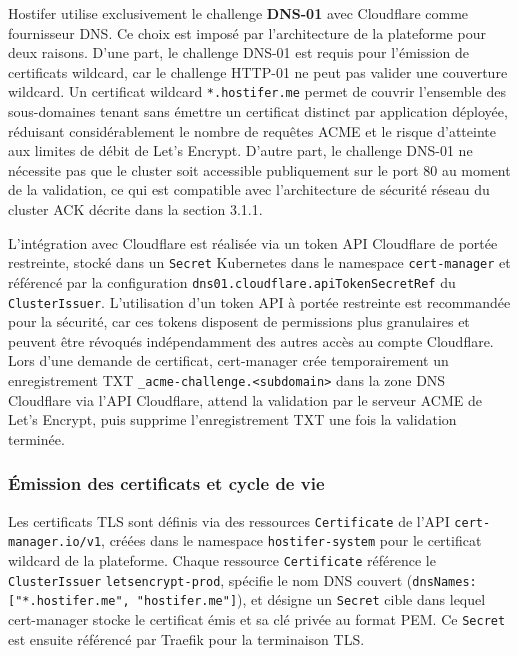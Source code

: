 Hostifer utilise exclusivement le challenge \textbf{DNS-01} avec Cloudflare comme fournisseur DNS. Ce choix est imposé par l'architecture de la plateforme pour deux raisons. D'une part, le challenge DNS-01 est requis pour l'émission de certificats wildcard, car le challenge HTTP-01 ne peut pas valider une couverture wildcard.  Un certificat wildcard \texttt{*.hostifer.me} permet de couvrir l'ensemble des sous-domaines tenant sans émettre un certificat distinct par application déployée, réduisant considérablement le nombre de requêtes ACME et le risque d'atteinte aux limites de débit de Let's Encrypt. D'autre part, le challenge DNS-01 ne nécessite pas que le cluster soit accessible publiquement sur le port 80 au moment de la validation, ce qui est compatible avec l'architecture de sécurité réseau du cluster ACK décrite dans la section 3.1.1.

L'intégration avec Cloudflare est réalisée via un token API Cloudflare de portée restreinte, stocké dans un \texttt{Secret} Kubernetes dans le namespace \texttt{cert-manager} et référencé par la configuration \texttt{dns01.cloudflare.apiTokenSecretRef} du \texttt{ClusterIssuer}. L'utilisation d'un token API à portée restreinte est recommandée pour la sécurité, car ces tokens disposent de permissions plus granulaires et peuvent être révoqués indépendamment des autres accès au compte Cloudflare.  Lors d'une demande de certificat, cert-manager crée temporairement un enregistrement TXT \texttt{\_acme-challenge.<subdomain>} dans la zone DNS Cloudflare via l'API Cloudflare, attend la validation par le serveur ACME de Let's Encrypt, puis supprime l'enregistrement TXT une fois la validation terminée.

\subsubsection*{Émission des certificats et cycle de vie}

Les certificats TLS sont définis via des ressources \texttt{Certificate} de l'API \texttt{cert-manager.io/v1}, créées dans le namespace \texttt{hostifer-system} pour le certificat wildcard de la plateforme. Chaque ressource \texttt{Certificate} référence le \texttt{ClusterIssuer} \texttt{letsencrypt-prod}, spécifie le nom DNS couvert (\texttt{dnsNames: ["*.hostifer.me", "hostifer.me"]}), et désigne un \texttt{Secret} cible dans lequel cert-manager stocke le certificat émis et sa clé privée au format PEM. Ce \texttt{Secret} est ensuite référencé par Traefik pour la terminaison TLS.

